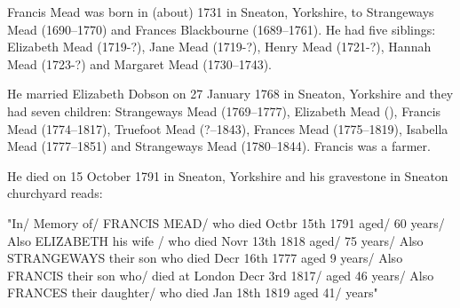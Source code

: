 
Francis Mead was born in (about) 1731 in Sneaton, Yorkshire, to Strangeways Mead (1690--1770) and Frances Blackbourne (1689--1761). He had five siblings: Elizabeth Mead (1719-?), Jane Mead (1719-?), Henry Mead (1721-?), Hannah Mead (1723-?) and Margaret Mead (1730--1743). 

He married Elizabeth Dobson on 27 January 1768 in Sneaton, Yorkshire and they had seven children:  Strangeways Mead (1769--1777), Elizabeth Mead (), Francis Mead (1774--1817), Truefoot Mead (?--1843), Frances Mead (1775--1819), Isabella Mead (1777--1851) and Strangeways Mead (1780--1844). Francis was a farmer.

He died on 15 October 1791 in	Sneaton, Yorkshire \cite{FMeadDeath} and his gravestone in Sneaton churchyard reads:

"In/ Memory of/ FRANCIS MEAD/ who died Octbr 15th 1791 aged/ 60 years/ Also ELIZABETH his wife / who died Novr 13th 1818 aged/ 75 years/ Also STRANGEWAYS their son who died Decr 16th 1777 aged 9 years/ Also FRANCIS their son who/ died at London Decr 3rd 1817/ aged 46 years/ Also FRANCES their daughter/ who died Jan 18th 1819 aged 41/ years"

